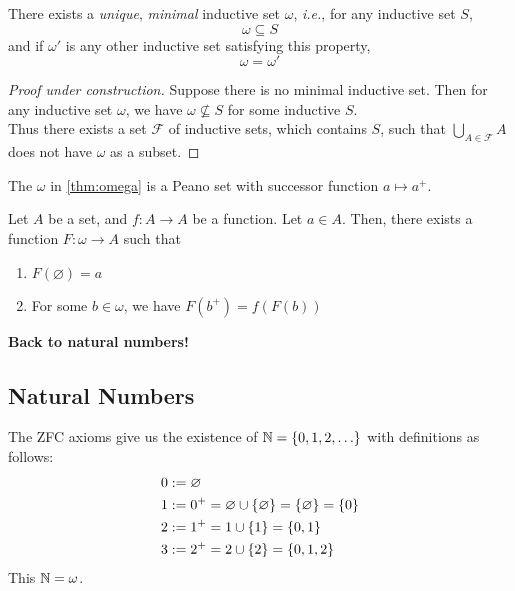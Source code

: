 \documentclass[12pt]{article}
\begin{document}
\begin{thm} \label{thm:omega}
    There exists a \emph{unique}, \emph{minimal} inductive set $\omega$, \textit{i.e.}, for any inductive set $S$, \[
        \omega \subseteq S
    \] and if $\omega'$ is any other inductive set satisfying this property, \[
        \omega = \omega'
    \]
\end{thm}
\begin{proof}[Proof under construction]
    Suppose there is no minimal inductive set. Then for any inductive set $\omega$, we have $ \omega \not\subseteq S$ for some inductive $S$. \\
    Thus there exists a set $\mathscr{F}$ of inductive sets, which contains $S$, such that $\bigcup_{A \in \mathscr{F}} A$ does not have $\omega$ as a subset.
\end{proof}


\begin{thm} \label{thm:omega peano}
    The $\omega$ in \cref{thm:omega} is a Peano set with successor function $a \mapsto a^{+}$.
\end{thm}

\begin{thm} \label{thm:recursion}
    Let $A$ be a set, and $f: A \to A$ be a function. Let $a \in A$. Then, there exists a function $F: \omega \to A$ such that
    \begin{enumerate}[label=(\alph*)]
        \item $F(\varnothing) = a$
        \item For some $b \in \omega$, we have $F(b^{+}) = f(F(b))$
    \end{enumerate}
\end{thm}

\textbf{Back to natural numbers!}

\subsection{Natural Numbers}

The ZFC axioms give us the existence of $\N = \set{0, 1, 2, \dots}$ with definitions as follows:
\begin{align*}
    0 &:= \varnothing \\
    1 &:= 0^{+} = \varnothing \cup \set{\varnothing} = \set{\varnothing} = \set{0} \\
    2 &:= 1^{+} = 1 \cup \set{1} = \set{0, 1} \\
    3 &:= 2^{+} = 2 \cup \set{2} = \set{0, 1, 2}
\end{align*}
This $\mathbb{N} = \omega$.
\end{document}
